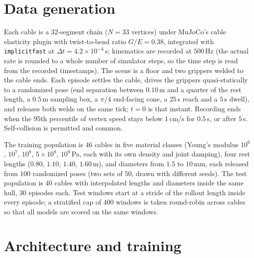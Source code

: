 \documentclass[mlabstract,onecolumn]{jmlr}
\begin{document}


\appendix

\section{Data generation}
\label{apd:data}

Each cable is a 32-segment chain ($N{=}33$ vertices) under MuJoCo's cable
elasticity plugin with twist-to-bend ratio $G/E{=}0.38$, integrated with
\texttt{implicitfast} at $\Delta t{=}4.2\times10^{-4}$\,s; kinematics are
recorded at $500$\,Hz (the actual rate is rounded to a whole number of
simulator steps, so the time step is read from the recorded timestamps). The scene is
a floor and two grippers welded to the cable ends. Each episode settles the
cable, drives the grippers quasi-statically to a randomized pose (end
separation between $0.10$\,m and a quarter of the rest length, a $0.5$\,m
sampling box, a $\pi/4$ end-facing cone, a $25$\,s reach and a $5$\,s dwell),
and releases both welds on the same tick; $t{=}0$ is that instant. Recording
ends when the 95th percentile of vertex speed stays below $1$\,cm/s for
$0.5$\,s, or after $5$\,s. Self-collision is permitted and common.

The training population is $46$ cables in five material classes (Young's
modulus $10^{6}$, $10^{7}$, $10^{8}$, $5\times10^{8}$, $10^{9}$\,Pa, each with
its own density and joint damping), four rest lengths ($0.80$, $1.10$, $1.40$,
$1.60$\,m), and diameters from $1.5$ to $10$\,mm, each released from $100$
randomized poses (two sets of $50$, drawn with different seeds). The test population is $40$
cables with interpolated lengths and diameters inside the same hull, $30$
episodes each. Test windows start at a stride of the rollout length inside
every episode; a stratified cap of $400$ windows is taken round-robin across
cables so that all models are scored on the same windows.

\section{Architecture and training}
\label{apd:training}
\end{document}
